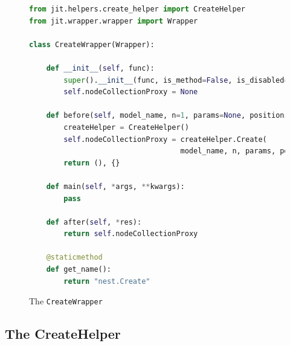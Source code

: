 \begin{figure}[ht!]
    \centering
    \begin{lstlisting}[language=Python, label=lst:create_wrapper]
from jit.helpers.create_helper import CreateHelper
from jit.wrapper.wrapper import Wrapper

class CreateWrapper(Wrapper):

    def __init__(self, func):
        super().__init__(func, is_method=False, is_disabled=False)
        self.nodeCollectionProxy = None
        
    def before(self, model_name, n=1, params=None, positions=None):
        createHelper = CreateHelper()
        self.nodeCollectionProxy = createHelper.Create(
                                   model_name, n, params, positions)
        return (), {}
    
    def main(self, *args, **kwargs):
        pass
    
    def after(self, *res):
        return self.nodeCollectionProxy
    
    @staticmethod
    def get_name():
        return "nest.Create"
\end{lstlisting}
    \caption{The \texttt{CreateWrapper}}
\end{figure}




\subsection{The CreateHelper}

